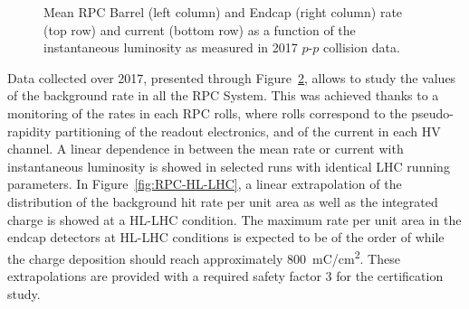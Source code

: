 \begin{figure}[H]
\begin{subfigure}{0.5\linewidth}
			\caption{\label{fig:Rate-I-vs-Lumi:D}}
		\end{subfigure}
		\caption{\label{fig:Rate-I-vs-Lumi} Mean RPC Barrel (left column) and Endcap (right column) rate (top row) and current (bottom row) as a function of the instantaneous luminosity as measured in 2017 $p$-$p$ collision data.}
	\end{figure}

	Data collected over 2017, presented through Figure~\ref{fig:Rate-I-vs-Lumi}, allows to study the values of the background rate in all the RPC System. This was achieved thanks to a monitoring of the rates in each RPC rolls, where rolls correspond to the pseudo-rapidity partitioning of the readout electronics, and of the current in each HV channel. A linear dependence in between the mean rate or current with instantaneous luminosity is showed in selected runs with identical LHC running parameters. In Figure~\ref{fig:RPC-HL-LHC}, a linear extrapolation of the distribution of the background hit rate per unit area as well as the integrated charge is showed at a HL-LHC condition. The maximum rate per unit area in the endcap detectors at HL-LHC conditions is expected to be of the order of  while the charge deposition should reach approximately \SI{800}{mC/cm^2}. These extrapolations are provided with a required safety factor 3 for the certification study.
    
